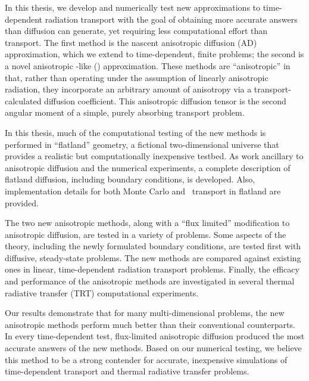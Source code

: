 
In this thesis, we develop and numerically test new approximations to
time-dependent radiation transport with the goal of obtaining more accurate
answers than diffusion can generate, yet requiring less computational effort
than transport.
The first method is the nascent anisotropic diffusion (AD)
approximation, which we extend to time-dependent, finite problems; the
second is a novel anisotropic \Pone-like (\APone) approximation. These methods
are ``anisotropic'' in that, rather than operating under the assumption of
linearly anisotropic radiation, they incorporate an arbitrary amount of
anisotropy via a transport-calculated diffusion coefficient. This anisotropic
diffusion tensor is the second angular moment of a simple, purely
absorbing transport problem.

In this thesis, much of the computational testing of the new methods is performed in
``flatland'' geometry, a fictional two-dimensional universe that provides a
realistic but computationally inexpensive testbed. As work ancillary to
anisotropic
diffusion and the numerical experiments, a complete description
of flatland diffusion, including boundary conditions, is developed. Also,
implementation details for both Monte Carlo and \SN\ transport in
flatland are provided.

The two new anisotropic methods, along with a ``flux limited'' modification to
anisotropic diffusion, are tested in a variety of problems. Some aspects of the
theory, including the newly formulated boundary conditions, are tested first with
diffusive, steady-state problems. The new methods are compared against
existing ones in linear, time-dependent radiation transport problems. Finally,
the efficacy and performance of the anisotropic methods are investigated in
several thermal radiative transfer (TRT) computational experiments.

Our results demonstrate that for many multi-dimensional problems, the new
anisotropic methods perform much better than their conventional counterparts.
In every time-dependent test, flux-limited anisotropic diffusion produced the
most accurate answers of the new methods.
Based on our numerical testing, we believe this method to be a strong contender
for accurate, inexpensive simulations of time-dependent transport and
thermal radiative transfer problems.

